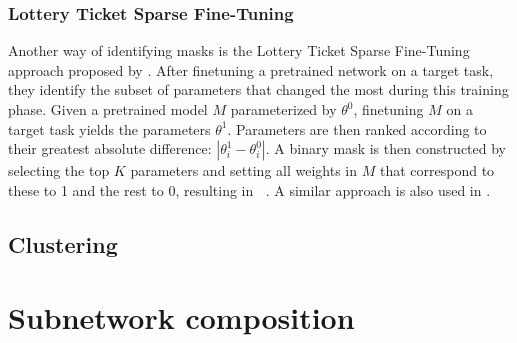 \documentclass[11pt]{article}
\DeclareMathOperator*{\subnetwork}{\hat{\theta_i}}
\begin{document}
\subsubsection{Lottery Ticket Sparse Fine-Tuning}
Another way of identifying masks is the Lottery Ticket Sparse Fine-Tuning approach proposed by \citet{ansell-etal-2022-composable}. After finetuning a pretrained network on a target task, they identify the subset of parameters that changed the most during this training phase. Given a pretrained model $M$ parameterized by $\theta^0$, finetuning $M$ on a target task yields the parameters $\theta^1$. Parameters are then ranked according to their greatest absolute difference: $|\theta^1_i - \theta^0_i|$. A binary mask is then constructed by selecting the top $K$ parameters and setting all weights in $M$ that correspond to these to 1 and the rest to 0, resulting in $\subnetwork$. A similar approach is also used in \citet{frankle2018the}.

\subsection{Clustering}
\citet{watanabe2019interpreting, casper2022graphical}

\section{Subnetwork composition}

\newpage

\end{document}
